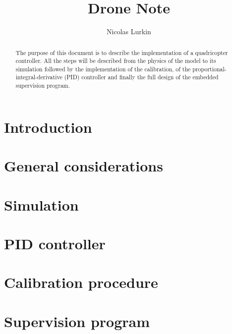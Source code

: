 \documentclass{article}
\title{Drone Note}
\author{Nicolas Lurkin}
\begin{document}
\maketitle

\begin{abstract}
The purpose of this document is to describe the implementation of a quadricopter
controller. All the steps will be described from the physics of the model to its
simulation followed by the implementation of the calibration, of the
proportional-integral-derivative (PID) controller and finally the full design of
the embedded supervision program.
\end{abstract}

\section{Introduction} 

\section{General considerations}


\section{Simulation}


\section{PID controller}

\section{Calibration procedure}

\section{Supervision program}

\thebibliography{}
\end{document}
